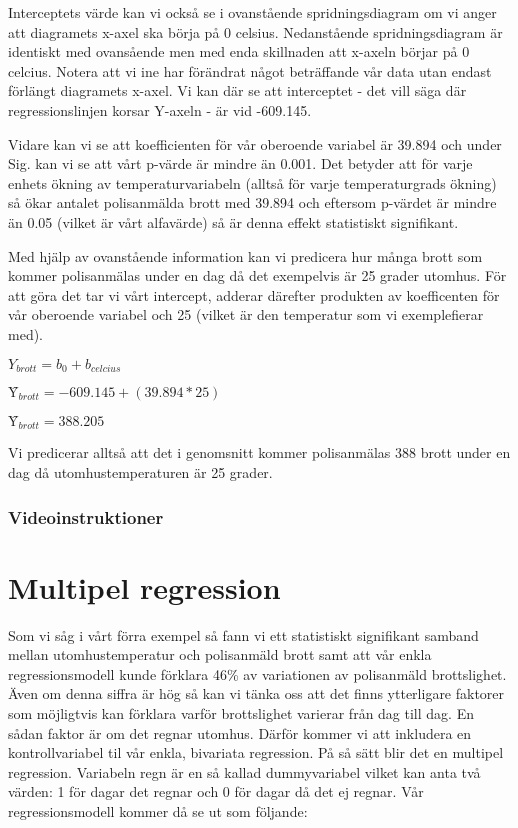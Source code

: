 \documentclass[
]{book}
\begin{document}
Interceptets värde kan vi också se i ovanstående spridningsdiagram om vi anger att diagramets x-axel ska börja på 0 celsius. Nedanstående spridningsdiagram är identiskt med ovansående men med enda skillnaden att x-axeln börjar på 0 celcius. Notera att vi ine har förändrat något beträffande vår data utan endast förlängt diagramets x-axel. Vi kan där se att interceptet - det vill säga där regressionslinjen korsar Y-axeln - är vid -609.145.

Vidare kan vi se att koefficienten för vår oberoende variabel är 39.894 och under Sig. kan vi se att vårt p-värde är mindre än 0.001. Det betyder att för varje enhets ökning av temperaturvariabeln (alltså för varje temperaturgrads ökning) så ökar antalet polisanmälda brott med 39.894 och eftersom p-värdet är mindre än 0.05 (vilket är vårt alfavärde) så är denna effekt statistiskt signifikant.

Med hjälp av ovanstående information kan vi predicera hur många brott som kommer polisanmälas under en dag då det exempelvis är 25 grader utomhus. För att göra det tar vi vårt intercept, adderar därefter produkten av koefficenten för vår oberoende variabel och 25 (vilket är den temperatur som vi exemplefierar med).

\(Y_{brott} = b_0 + b_{celcius}\)

\(Ŷ_{brott} = -609.145 + (39.894*25)\)

\(Ŷ_{brott} = 388.205\)

Vi predicerar alltså att det i genomsnitt kommer polisanmälas 388 brott under en dag då utomhustemperaturen är 25 grader.

\hypertarget{videoinstruktioner-9}{%
\subsection{Videoinstruktioner}\label{videoinstruktioner-9}}

\hypertarget{multipel-regression}{%
\chapter{Multipel regression}\label{multipel-regression}}

Som vi såg i vårt förra exempel så fann vi ett statistiskt signifikant samband mellan utomhustemperatur och polisanmäld brott samt att vår enkla regressionsmodell kunde förklara 46\% av variationen av polisanmäld brottslighet. Även om denna siffra är hög så kan vi tänka oss att det finns ytterligare faktorer som möjligtvis kan förklara varför brottslighet varierar från dag till dag. En sådan faktor är om det regnar utomhus. Därför kommer vi att inkludera en kontrollvariabel til vår enkla, bivariata regression. På så sätt blir det en multipel regression. Variabeln regn är en så kallad dummyvariabel vilket kan anta två värden: 1 för dagar det regnar och 0 för dagar då det ej regnar. Vår regressionsmodell kommer då se ut som följande:
\end{document}
